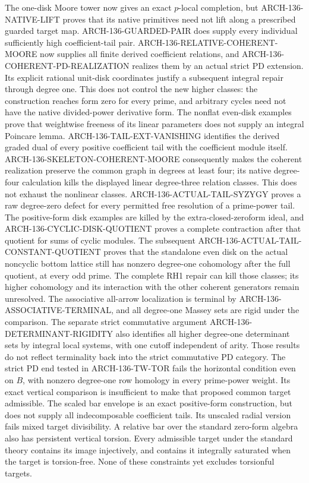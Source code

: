 \documentclass[11pt,a4paper]{article}
\begin{document}
The one-disk Moore tower now gives an exact $p$-local completion,
but ARCH-136-NATIVE-LIFT proves that its native primitives need not
lift along a prescribed guarded target map. ARCH-136-GUARDED-PAIR
does supply every individual sufficiently high coefficient-tail
pair. ARCH-136-RELATIVE-COHERENT-MOORE now supplies all finite
derived coefficient relations, and ARCH-136-COHERENT-PD-REALIZATION
realizes them by an actual strict PD extension. Its explicit rational
unit-disk coordinates justify a subsequent integral repair through
degree one. This does not control the new higher classes: the
construction reaches form zero for every prime, and arbitrary cycles
need not have the native divided-power derivative form. The nonflat
even-disk examples prove that weightwise freeness of its linear
parameters does not supply an integral Poincare lemma.
ARCH-136-TAIL-EXT-VANISHING identifies the derived graded dual of
every positive coefficient tail with the coefficient module itself.
ARCH-136-SKELETON-COHERENT-MOORE consequently makes the coherent
realization preserve the common graph in degrees at least four;
its native degree-four calculation kills the displayed linear
degree-three relation classes. This does not exhaust the nonlinear
classes. ARCH-136-ACTUAL-TAIL-SYZYGY proves a raw degree-zero defect
for every permitted free resolution of a prime-power tail. The
positive-form disk examples are killed by the extra-closed-zeroform
ideal, and ARCH-136-CYCLIC-DISK-QUOTIENT proves a complete contraction
after that quotient for sums of cyclic modules. The subsequent
ARCH-136-ACTUAL-TAIL-CONSTANT-QUOTIENT proves that the standalone
even disk on the actual noncyclic bottom lattice still has nonzero
degree-one cohomology after the full quotient, at every odd prime.
The complete RH1 repair can kill those classes; its higher cohomology
and its interaction with the other coherent generators remain unresolved.
The associative all-arrow localization is
terminal by ARCH-136-ASSOCIATIVE-TERMINAL, and all degree-one
Massey sets are rigid under the comparison. The separate strict
commutative argument ARCH-136-DETERMINANT-RIGIDITY also identifies
all higher degree-one determinant sets by integral local systems,
with one cutoff independent of arity. Those results do not
reflect terminality back into the strict commutative PD category.
The strict PD end tested in ARCH-136-TW-TOR fails the horizontal
condition even on $B$, with nonzero degree-one row homology in
every prime-power weight. Its exact vertical comparison is
insufficient to make that proposed common target admissible.
The scaled bar envelope is an exact positive-form construction, but
does not supply all indecomposable coefficient tails. Its unscaled
radial version fails mixed target divisibility. A relative bar over
the standard zero-form algebra also has persistent vertical torsion.
Every admissible target under the standard theory contains its image
injectively, and contains it integrally saturated when the target is
torsion-free. None of these constraints yet excludes torsionful targets.
\end{document}
